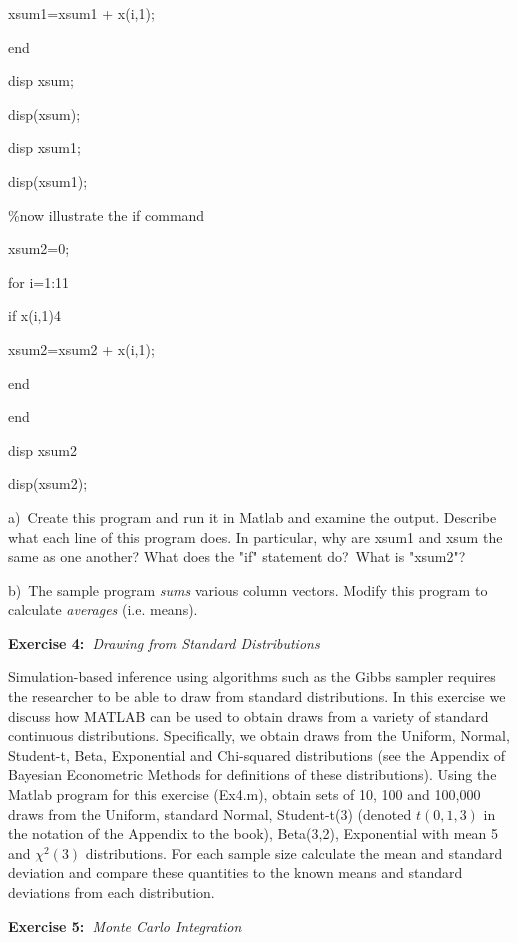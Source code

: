 \documentclass{article}
\begin{document}
xsum1=xsum1 + x(i,1);

end

disp xsum;

disp(xsum);

disp xsum1;

disp(xsum1);

\%now illustrate the if command

xsum2=0;

for i=1:11

if x(i,1)\TEXTsymbol{>}4

xsum2=xsum2 + x(i,1);

end

end

disp xsum2

disp(xsum2);

\bigskip

a)\ Create this program and run it in Matlab and examine the output.
Describe what each line of this program does. In particular, why are xsum1
and xsum the same as one another? What does the "if" statement do?\ What is
"xsum2"?

b)\ The sample program \textit{sums} various column vectors. Modify this
program to calculate \textit{averages} (i.e. means).

\bigskip

\textbf{Exercise 4:\ }\textit{Drawing from Standard Distributions}

Simulation-based inference using algorithms such as the Gibbs sampler
requires the researcher to be able to draw from standard distributions. In
this exercise we discuss how MATLAB can be used to obtain draws from a
variety of standard continuous distributions. Specifically, we obtain draws
from the Uniform, Normal, Student-t, Beta, Exponential and Chi-squared
distributions (see the Appendix of Bayesian Econometric Methods for
definitions of these distributions). Using the Matlab program for this
exercise (Ex4.m), obtain sets of 10, 100 and 100,000 draws from the Uniform,
standard Normal, Student-t(3) (denoted $t\left( 0,1,3\right) $ in the
notation of the Appendix to the book), Beta(3,2), Exponential with mean 5
and $\chi ^{2}\left( 3\right) $ distributions. For each sample size
calculate the mean and standard deviation and compare these quantities to
the known means and standard deviations from each distribution.

\bigskip

\textbf{Exercise 5:\ }\textit{Monte Carlo Integration}
\end{document}
